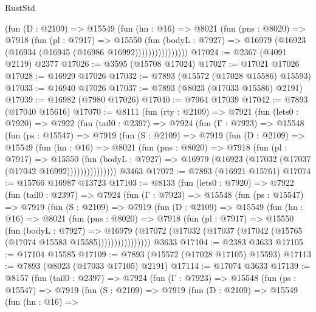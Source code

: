 \begin{lexlean}{RustStd}
\begin{coremodule}
                  (fun (D : @2109) =>
                  @15549
                    (fun (hn : @16) =>
                    @8021
                      (fun (pns : @8020) =>
                      @7918
                        (fun (pl : @7917) =>
                        @15550
                          (fun (bodyL : @7927) =>
                          @16979 (@16923 (@16934 (@16945 (@16986 @16992))))))))))))))))
@17024 := @2367 (@4091 @2119) @2377
@17026 := @3595 (@15708 @17024)
@17027 := @17021 @17026
@17028 := @16929 @17026
@17032 := @7893 (@15572 (@17028 @15586) @15593)
@17033 := @16940 @17026
@17037 := @7893 (@8023 (@17033 @15586) @2191)
@17039 := @16982 (@7980 @17026)
@17040 := @7964 @17039
@17042 := @7893 (@17040 @15616)
@17070 := @8111
    (fun (rty : @2109) =>
    @7921
      (fun (lets0 : @7920) =>
      @7922
        (fun (tail0 : @2397) =>
        @7924
          (fun (Γ : @7923) =>
          @15548
            (fun (ps : @15547) =>
            @7919
              (fun (S : @2109) =>
              @7919
                (fun (D : @2109) =>
                @15549
                  (fun (hn : @16) =>
                  @8021
                    (fun (pns : @8020) =>
                    @7918
                      (fun (pl : @7917) =>
                      @15550
                        (fun (bodyL : @7927) =>
                        @16979 (@16923 (@17032 (@17037 (@17042 @16992)))))))))))))))
    @3463
@17072 := @7893 (@16921 @15761)
@17074 := @15766 @16987 @13723
@17103 := @8133
    (fun (lets0 : @7920) =>
    @7922
      (fun (tail0 : @2397) =>
      @7924
        (fun (Γ : @7923) =>
        @15548
          (fun (ps : @15547) =>
          @7919
            (fun (S : @2109) =>
            @7919
              (fun (D : @2109) =>
              @15549
                (fun (hn : @16) =>
                @8021
                  (fun (pns : @8020) =>
                  @7918
                    (fun (pl : @7917) =>
                    @15550
                      (fun (bodyL : @7927) =>
                      @16979
                        (@17072
                          (@17032 (@17037 (@17042 (@15765 (@17074 @15583 @15585))))))))))))))))
    @3633
@17104 := @2383 @3633
@17105 := @17104 @15585
@17109 := @7893 (@15572 (@17028 @17105) @15593)
@17113 := @7893 (@8023 (@17033 @17105) @2191)
@17114 := @17074 @3633
@17139 := @8157
    (fun (tail0 : @2397) =>
    @7924
      (fun (Γ : @7923) =>
      @15548
        (fun (ps : @15547) =>
        @7919
          (fun (S : @2109) =>
          @7919
            (fun (D : @2109) =>
            @15549
              (fun (hn : @16) =>

\end{coremodule}
\end{lexlean}
